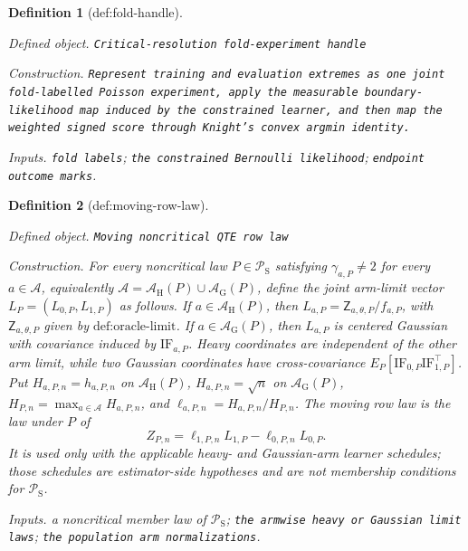 \documentclass{article}
\newtheorem{definition}{Definition}
\begin{document}
\begin{definition}[def:fold-handle]\label{def:fold-handle}
\par\smallskip\noindent\emph{Defined object.} \texttt{Critical-\allowbreak{}resolution fold-\allowbreak{}experiment handle}
\par\smallskip\noindent\emph{Construction.} \texttt{Represent training and evaluation extremes as one joint fold-\allowbreak{}labelled Poisson experiment,\allowbreak{} apply the measurable boundary-\allowbreak{}likelihood map induced by the constrained learner,\allowbreak{} and then map the weighted signed score through Knight's convex argmin identity.}
\par\smallskip\noindent\emph{Inputs.} \texttt{fold labels}; \texttt{the constrained Bernoulli likelihood}; \texttt{endpoint outcome marks}.
\end{definition}

\begin{definition}[def:moving-row-law]\label{def:moving-row-law}
\par\smallskip\noindent\emph{Defined object.} \texttt{Moving noncritical QTE row law}
\par\smallskip\noindent\emph{Construction.} For every noncritical law \(P\in\mathcal P_{\mathrm S}\) satisfying \(\gamma_{a,P}\ne2\) for every \(a\in\mathcal A\), equivalently \(\mathcal A=\mathcal A_{\mathrm H}(P)\cup\mathcal A_{\mathrm G}(P)\), define the joint arm-limit vector \(L_P=(L_{0,P},L_{1,P})\) as follows.  If \(a\in\mathcal A_{\mathrm H}(P)\), then \(L_{a,P}=\mathsf Z_{a,\theta,P}/f_{a,P}\), with \(\mathsf Z_{a,\theta,P}\) given by \(\text{def:oracle-limit}\).  If \(a\in\mathcal A_{\mathrm G}(P)\), then \(L_{a,P}\) is centered Gaussian with covariance induced by \(\mathrm{IF}_{a,P}\).  Heavy coordinates are independent of the other arm limit, while two Gaussian coordinates have cross-covariance \(E_P[\mathrm{IF}_{0,P}\mathrm{IF}_{1,P}^{\top}]\).  Put \(H_{a,P,n}=h_{a,P,n}\) on \(\mathcal A_{\mathrm H}(P)\), \(H_{a,P,n}=\sqrt n\) on \(\mathcal A_{\mathrm G}(P)\), \(H_{P,n}=\max_{a\in\mathcal A}H_{a,P,n}\), and \(\ell_{a,P,n}=H_{a,P,n}/H_{P,n}\).  The moving row law is the law under \(P\) of
\[
Z_{P,n}=\ell_{1,P,n}L_{1,P}-\ell_{0,P,n}L_{0,P}.
\]
It is used only with the applicable heavy- and Gaussian-arm learner schedules; those schedules are estimator-side hypotheses and are not membership conditions for \(\mathcal P_{\mathrm S}\).
\par\smallskip\noindent\emph{Inputs.} a noncritical member law of \(\mathcal P_{\mathrm S}\); \texttt{the armwise heavy or Gaussian limit laws}; \texttt{the population arm normalizations}.
\end{definition}
\end{document}
